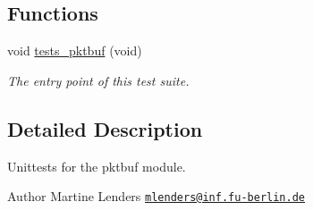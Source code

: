 \subsection*{Functions}
\begin{DoxyCompactItemize}
\item 
void \hyperlink{group__unittests_gaa089380b8bfe478c2b7f3684af323767}{tests\+\_\+pktbuf} (void)
\begin{DoxyCompactList}\small\item\em The entry point of this test suite. \end{DoxyCompactList}\end{DoxyCompactItemize}


\subsection{Detailed Description}
Unittests for the {\ttfamily pktbuf} module. 

\begin{DoxyAuthor}{Author}
Martine Lenders \href{mailto:mlenders@inf.fu-berlin.de}{\tt mlenders@inf.\+fu-\/berlin.\+de} 
\end{DoxyAuthor}
